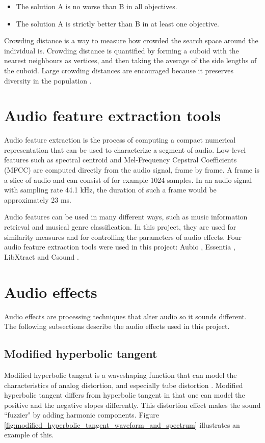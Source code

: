 \begin{itemize}  
\item The solution A is no worse than B in all objectives.
\item The solution A is strictly better than B in at least one objective.
\end{itemize}

Crowding distance is a way to measure how crowded the search space around the individual is. Crowding distance is quantified by forming a cuboid with the nearest neighbours as vertices, and then taking the average of the side lengths of the cuboid. Large crowding distances are encouraged because it preserves diversity in the population \citep{nsga2}.

\section{Audio feature extraction tools}
Audio feature extraction is the process of computing a compact numerical representation that can be used to characterize a segment of audio. Low-level features such as spectral centroid and Mel-Frequency Cepstral Coefficients (MFCC) \citep{mermelstein1976, logan2000} are computed directly from the audio signal, frame by frame. A frame is a slice of audio and can consist of for example 1024 samples. In an audio signal with sampling rate 44.1 kHz, the duration of such a frame would be approximately 23 ms.

Audio features can be used in many different ways, such as music information retrieval and musical genre classification. In this project, they are used for similarity measures and for controlling the parameters of audio effects. Four audio feature extraction tools were used in this project: Aubio \citep{brossier2003aubio}, Essentia \citep{bogdanov2013essentia}, LibXtract \citep{bullock2007libxtract} and Csound \citep{csound}.

\section{Audio effects}
Audio effects are processing techniques that alter audio so it sounds different. The following subsections describe the audio effects used in this project.

\subsection{Modified hyperbolic tangent}
Modified hyperbolic tangent is a waveshaping function that can model the characteristics of analog distortion, and especially tube distortion \citep{mtanh}. Modified hyperbolic tangent differs from hyperbolic tangent in that one can model the positive and the negative slopes differently. This distortion effect makes the sound ``fuzzier" by adding harmonic components. Figure \ref{fig:modified_hyperbolic_tangent_waveform_and_spectrum} illustrates an example of this.

